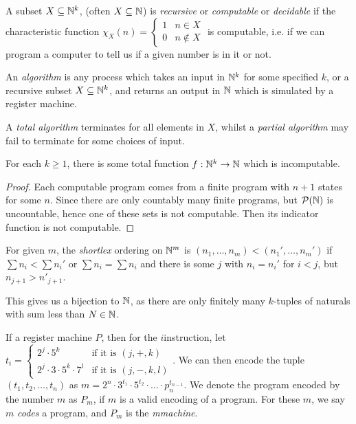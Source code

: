 \documentclass[10pt,a4paper]{article}
\begin{document}
A subset $X\subseteq \mathbb{N}^k$, (often $X\subseteq \mathbb{N}$) is \emph{recursive} or \emph{computable} or \emph{decidable} if the characteristic function $\chi_X(n) = \begin{cases} 1 & n\in X \\ 0 & n \notin X\end{cases}$ is computable, i.e. if we can program a computer to tell us if a given number is in it or not.

An \emph{algorithm} is any process which takes an input in $\mathbb{N}^k$ for some specified $k$, or a recursive subset $X\subseteq \mathbb{N}^k$, and returns an output in $\mathbb{N}$ which is simulated by a register machine.

A \emph{total algorithm} terminates for all elements in $X$, whilst a \emph{partial algorithm} may fail to terminate for some choices of input.

\begin{lemma}
For each $k\geq 1$, there is some total function $f:\mathbb{N}^k \to \mathbb{N}$ which is incomputable.
\end{lemma}
\begin{proof}
Each computable program comes from a finite program with $n+1$ states for some $n$. Since there are only countably many finite programs, but $\mathcal{P}(\mathbb{N})$ is uncountable, hence one of these sets is not computable. Then its indicator function is not computable.
\end{proof}

For given $m$, the \emph{shortlex} ordering on $\mathbb{N}^m$ is $(n_1,\ldots, n_m) < (n_1', \ldots, n_m')$ if $\sum n_i < \sum n_i'$ or $\sum n_i = \sum n_i$ and there is some $j$ with $n_i = n_i'$ for $i<j$, but $n_{j+1} > n'_{j+1}$.

This gives us a bijection to $\mathbb{N}$, as there are only finitely many $k$-tuples of naturals with sum less than $N \in \mathbb{N}$.

If a register machine $P$, then for the $i$\th instruction, let $t_i = \begin{cases} 2^j \cdot 5^k & \text{if it is } (j, +, k) \\ 2^j\cdot 3\cdot 5^k \cdot 7^l & \text{if it is } (j,-,k,l)\end{cases}$. We can then encode the tuple $(t_1, t_2, \ldots, t_n)$ as $m=2^n\cdot 3^{t_1}\cdot 5^{t_2} \cdot\ldots \cdot p_n^{t_{n-1}}$. We denote the program encoded by the number $m$ as $P_m$, if $m$ is a valid encoding of a program. For these $m$, we say $m$ \emph{codes} a program, and $P_m$ is the \emph{m\th machine}.
\end{document}
